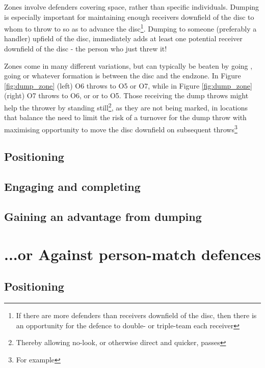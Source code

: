 \documentclass{tufte-handout}
\begin{document}
Zones 
involve defenders 
covering space, 
rather than 
specific individuals. 
Dumping is 
especially important 
for maintaining 
enough receivers 
downfield of the disc 
to whom 
to throw to 
so as to 
advance 
the disc\footnote{
If there are more 
defenders 
than receivers
downfield 
of the disc, 
then there 
is an opportunity
for the defence 
to double-
or triple-team
each receiver}.
Dumping to 
someone 
(preferably a handler) 
upfield of 
the disc, 
immediately adds 
at least one
potential receiver 
downfield 
of the disc - 
the person who just threw it!

Zones come in
many different variations, 
but can typically be 
beaten 
by going , 
going  or 
whatever formation 
is between 
the disc 
and the endzone. 
In Figure \ref{fig:dump_zone}
(left) O6 throws 
to O5 or O7, 
while in Figure \ref{fig:dump_zone}
(right) O7 throws 
 to O6, 
or  
or  
to O5. 
Those receiving the 
dump throws 
might help 
the thrower 
by standing still\footnote{
Thereby allowing no-look, 
or otherwise direct 
and quicker,
passes}, 
as they are not 
being marked,
in locations that 
balance the 
need to 
limit the risk 
of a turnover 
for the dump throw 
with maximising
opportunity
to move the disc 
downfield 
on subsequent throws\footnote{
For example} 



\subsection{Positioning}
\label{sec:zone_positioning}

\subsection{Engaging and completing}
\label{sec:zone_engaging}

\subsection{Gaining an advantage from dumping}
\label{sec:zone_advantage}


\section{...or Against person-match defences}
\subsection{Positioning}
\label{sec:person-match_positioning}
\end{document}
